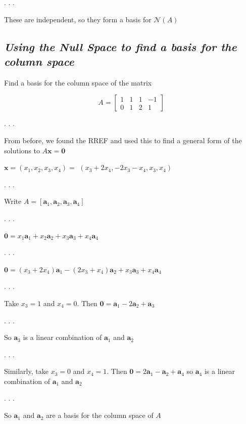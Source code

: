 \documentclass[
  letterpaper,
  DIV=11,
  numbers=noendperiod]{scrartcl}
\begin{document}
. . .

These are independent, so they form a basis for \(\mathcal{N}(A)\)

\subsection{\texorpdfstring{\emph{Using the Null Space to find a basis
for the column
space}}{Using the Null Space to find a basis for the column space}}\label{using-the-null-space-to-find-a-basis-for-the-column-space}

Find a basis for the column space of the matrix

\[
A=\left[\begin{array}{rrrr}
1 & 1 & 1 & -1 \\
0 & 1 & 2 & 1 
\end{array}\right]
\]

. . .

From before, we found the RREF and used this to find a general form of
the solutions to \(A \mathbf{x}=\mathbf{0}\)

\(\mathbf{x}=\left(x_{1}, x_{2}, x_{3}, x_{4}\right)=\)
\(\left(x_{3}+2 x_{4},-2 x_{3}-x_{4}, x_{3}, x_{4}\right)\)

. . .

Write
\(A=\left[\mathbf{a}_{1}, \mathbf{a}_{2}, \mathbf{a}_{3}, \mathbf{a}_{4}\right]\)

. . .

\(\mathbf{0}=x_{1} \mathbf{a}_{1}+x_{2} \mathbf{a}_{2}+x_{3} \mathbf{a}_{3}+x_{4} \mathbf{a}_{4}\)

. . .

\(\mathbf{0}=\left(x_{3}+2 x_{4}\right) \mathbf{a}_{1}-\left(2 x_{3}+x_{4}\right) \mathbf{a}_{2}+x_{3} \mathbf{a}_{3}+x_{4} \mathbf{a}_{4}\)

. . .

Take \(x_{3}=1\) and \(x_{4}=0\). Then
\(\mathbf{0}=\mathbf{a}_{1}-2 \mathbf{a}_{2}+\mathbf{a}_{3}\)

. . .

So \(\mathbf{a}_{3}\) is a linear combination of \(\mathbf{a}_{1}\) and
\(\mathbf{a}_{2}\)

. . .

Similarly, take \(x_{3}=0\) and \(x_{4}=1\). Then
\(\mathbf{0}=2 \mathbf{a}_{1}-\mathbf{a}_{2}+\mathbf{a}_{4}\) so
\(\mathbf{a}_{4}\) is a linear combination of \(\mathbf{a}_{1}\) and
\(\mathbf{a}_{2}\)

. . .

So \(\mathbf{a}_{1}\) and \(\mathbf{a}_{2}\) are a basis for the column
space of \(A\)
\end{document}
